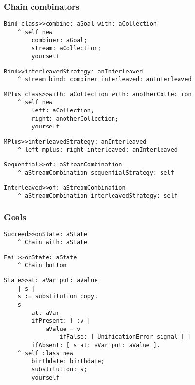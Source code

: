 \documentclass{beamer}
\begin{document}
\begin{frame}[fragile]
\frametitle{Chain combinators}
\begin{verbatim}
Bind class>>combine: aGoal with: aCollection
    ^ self new
        combiner: aGoal;
        stream: aCollection;
        yourself
\end{verbatim}
\begin{verbatim}
Bind>>interleavedStrategy: anInterleaved
    ^ stream bind: combiner interleaved: anInterleaved
\end{verbatim}
\begin{verbatim}
MPlus class>>with: aCollection with: anotherCollection
    ^ self new
        left: aCollection;
        right: anotherCollection;
        yourself
\end{verbatim}
\begin{verbatim}
MPlus>>interleavedStrategy: anInterleaved
    ^ left mplus: right interleaved: anInterleaved
\end{verbatim}
\begin{verbatim}
Sequential>>of: aStreamCombination
    ^ aStreamCombination sequentialStrategy: self
\end{verbatim}
\begin{verbatim}
Interleaved>>of: aStreamCombination
    ^ aStreamCombination interleavedStrategy: self
\end{verbatim}
\end{frame}

\begin{frame}[fragile]
\frametitle{Goals}
\begin{verbatim}
Succeed>>onState: aState
    ^ Chain with: aState
\end{verbatim}
\begin{verbatim}
Fail>>onState: aState
    ^ Chain bottom
\end{verbatim}
\begin{verbatim}
State>>at: aVar put: aValue
    | s |
    s := substitution copy.
    s
        at: aVar
        ifPresent: [ :v | 
            aValue = v
                ifFalse: [ UnificationError signal ] ]
        ifAbsent: [ s at: aVar put: aValue ].
    ^ self class new
        birthdate: birthdate;
        substitution: s;
        yourself
\end{verbatim}
\end{frame}
\end{document}
